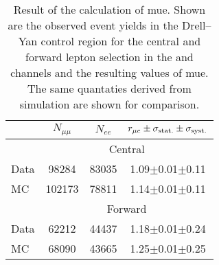 
\begin{table}[hbtp]
 \renewcommand{\arraystretch}{1.3}
 \setlength{\belowcaptionskip}{6pt}
 \centering
 \caption{Result of the calculation of 
mue. Shown are the observed event yields in the Drell--Yan control region for the central and forward lepton selection in the \EE and \MM channels and the resulting values of 
mue. The same quantaties derived from simulation are shown for comparison.}
  \label{tab:rMuE}
  \begin{tabular}{l| ccc }

    							& $N_{\mu\mu}$ &  $N_{ee}$ & $r_{\mu e} \pm \sigma_{\text{stat.}} \pm \sigma_{\text{syst.}}$ \\ 
    
    \hline
    							& \multicolumn{3}{c}{Central}  \\ 

    \hline
        Data       &  98284                   & 83035              &  1.09$\pm$0.01$\pm$0.11    \\

        MC       &  102173                   & 78811              &  1.14$\pm$0.01$\pm$0.11    \\

\hline
    							& \multicolumn{3}{c}{Forward}  \\ 

    \hline
        Data       &  62212                   & 44437              &  1.18$\pm$0.01$\pm$0.24    \\

        MC       &  68090                   & 43665              &  1.25$\pm$0.01$\pm$0.25    \\

  \end{tabular}
\end{table}


